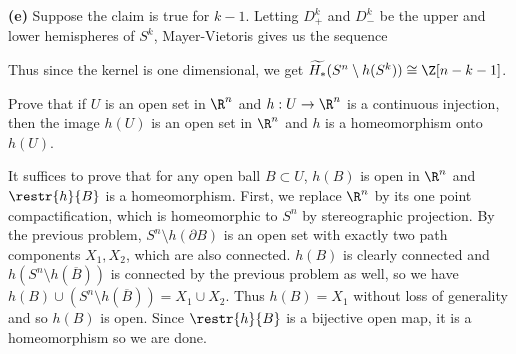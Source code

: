 \documentclass[11pt,letterpaper]{article}
\begin{document}
\begin{solution}
    \textbf{(e)} Suppose the claim is true for $k-1$. Letting $D^k_+$ and $D^k_-$ be the upper and lower hemispheres of $S^k$, Mayer-Vietoris gives us the sequence  
    \begin{center}
    \end{center}
    Thus since the kernel is one dimensional, we get $\widetilde{H_*}(S^n\setminus h(S^k))\cong \Z[n-k-1]$. 
\end{solution}

\begin{problem}
    Prove that if $U$ is an open set in $\R^n$ and $h : U \to \R^n$ is a continuous injection, then the image $h(U)$ is an open set in $\R^n$ and $h$ is a homeomorphism onto $h(U)$. 
\end{problem}

\begin{solution}
    \quad It suffices to prove that for any open ball $B\subset U$, $h(B)$ is open in $\R^n$ and $\restr{h}{B}$ is a homeomorphism. First, we replace $\R^n$ by its one point compactification, which is homeomorphic to $S^n$ by stereographic projection. By the previous problem, $S^n\setminus h(\partial B)$ is an open set with exactly two path components $X_1, X_2$, which are also connected. $h(B)$ is clearly connected and $h(S^n\setminus h(\overline{B}))$ is connected by the previous problem as well, so we have $h(B)\cup (S^n\setminus h(\overline{B})) = X_1\cup X_2$. Thus $h(B)=X_1$ without loss of generality and so $h(B)$ is open. Since $\restr{h}{B}$ is a bijective open map, it is a homeomorphism so we are done.
\end{solution}
\end{document}
